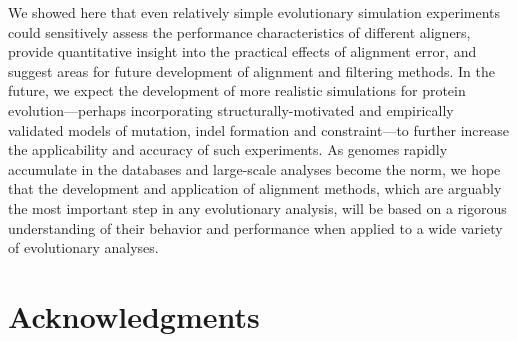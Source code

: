 \documentclass{article}
\begin{document}
We showed here that even relatively simple evolutionary simulation
experiments could sensitively assess the performance characteristics
of different aligners, provide quantitative insight into the practical
effects of alignment error, and suggest areas for future development
of alignment and filtering methods. In the future, we expect the
development of more realistic simulations for protein
evolution---perhaps incorporating structurally-motivated and
empirically validated models of mutation, indel formation and
constraint---to further increase the applicability and accuracy of
such experiments. As genomes rapidly accumulate in the databases and
large-scale analyses become the norm, we hope that the development and
application of alignment methods, which are arguably the most
important step in any evolutionary analysis, will be based on a
rigorous understanding of their behavior and performance when applied
to a wide variety of evolutionary analyses.

\section*{Acknowledgments}

 \fontsize{9}{10}\selectfont%


\end{document}

